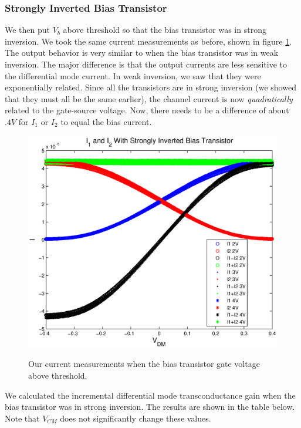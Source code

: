 \documentclass{article}
\begin{document}
\subsubsection*{Strongly Inverted Bias Transistor}

We then put $V_b$ above threshold so that the bias transistor was in strong inversion. We took the same current measurements as before, shown in figure \ref{strong}. The output behavior is very similar to when the bias transistor was in weak inversion. The major difference is that the output currents are less sensitive to the differential mode current. In weak inversion, we saw that they were exponentially related. Since all the transistors are in strong inversion (we showed that they must all be the same earlier), the channel current is now \emph{quadratically} related to the gate-source voltage. Now, there needs to be a difference of about $.4V$ for $I_1$ or $I_2$ to equal the bias current. \\

\begin{figure}[H]
\centering
\includegraphics[scale=.8]{currents_strong.eps}
\label{strong}
\caption{Our current measurements when the bias transistor gate voltage above threshold.}
\end{figure}

We calculated the incremental differential mode transconductance gain when the bias transistor was in strong inversion. The results are shown in the table below. Note that $V_{CM}$ does not significantly change these values.
\end{document}
